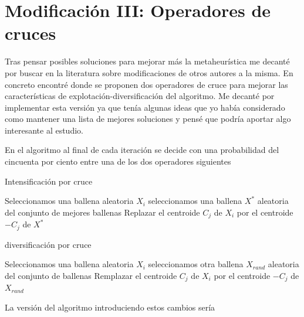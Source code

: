 \documentclass[11pt]{article}
\begin{document}
\section{Modificación III: Operadores de cruces}

Tras pensar posibles soluciones para mejorar más la metaheurística me decanté
por buscar en la literatura sobre modificaciones de otros autores a la misma.
En concreto encontré \cite{tabu} donde se proponen dos operadores de cruce para mejorar las
características de explotación-diversificación del algoritmo. Me decanté por
implementar esta versión ya que tenía algunas ideas que yo había considerado
como mantener una lista de mejores soluciones y pensé que podría aportar algo
interesante al estudio.

En el algoritmo al final de cada iteración se decide con una probabilidad del
cincuenta por ciento entre una de los dos operadores siguientes

\begin{algorithm}[H]
  \caption{Intensificación por cruce}
  \label{intensificacion}
  \begin{algorithmic}[1]
    \State Seleccionamos una ballena aleatoria $X_i$
    \State seleccionamos una ballena $X^*$ aleatoria del conjunto de mejores ballenas 
    \State Replazar el centroide $C_j$ de $X_i$ por el centroide $-C_j$ de $X^*$
    \EndFor
    \EndFor    
    \EndProcedure
\end{algorithmic}
\end{algorithm}

\begin{algorithm}[H]
  \caption{diversificación por cruce}
  \label{diversificacion}
  \begin{algorithmic}[1]
    \State Seleccionamos una ballena aleatoria $X_i$
    \State seleccionamos otra ballena $X_{rand}$ aleatoria del conjunto de ballenas 
    \State Remplazar el centroide $C_j$ de $X_i$ por el centroide $-C_j$ de $X_{rand}$
    \EndFor
    \EndFor    
    \EndProcedure
\end{algorithmic}
\end{algorithm}

La versión del algoritmo introduciendo estos cambios sería 
\end{document}
